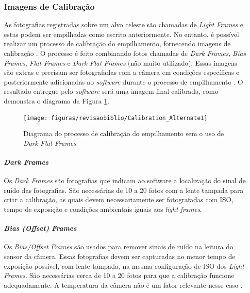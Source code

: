 \subsubsection{Imagens de Calibração}

As fotografias registradas sobre um alvo celeste são chamadas de \textit{Light Frames} e estas podem ser empilhadas como escrito anteriormente. No entanto, é possível realizar um processo de calibração do empilhamento, fornecendo imagens de calibração \cite{man:deepskystackerfaq}.
O processo é feito combinando fotos chamadas de \textit{Dark Frames},\textit{ Bias Frames}, \textit{Flat Frames} e \textit{Dark Flat Frames} (não muito utilizado). Essas imagens são extras e precisam ser fotografadas com a câmera em condições específicas e posteriormente adicionadas ao \textit{software} durante o processo de empilhamento 
\cite{man:deepskystackerBetterImages}. O resultado entregue pelo \textit{software} será uma imagem final calibrada, como demonstra o diagrama da Figura \ref{fig:calibrationDeepSkyStacker}.


\begin{figure}[!htb]
	\centering
	\caption{Diagrama do processo de calibração do empilhamento sem o uso de \textit{Dark Flat Frames}}
	\texttt{[image: figuras/revisaobiblio/Calibration\_Alternate1]}
	\label{fig:calibrationDeepSkyStacker}
\end{figure}


\paragraph{\textit{Dark Frames}}

Os \textit{Dark Frames} são fotografias que indicam ao software a localização do sinal de ruído das fotografias. São necessárias de 10 a 20 fotos com a lente tampada para criar a calibração, as quais devem necessariamente ser fotografadas com ISO, tempo de exposição e condições ambientais iguais aos \textit{light frames}.\cite{man:deepskystackerfaq}

\paragraph{\textit{Bias (Offset) Frames}}

Os \textit{Bias/Offset Frames} são usados para remover sinais de ruído na leitura do sensor da câmera. Essas fotografias devem ser capturadas no menor tempo de exposição possível, com lente tampada, na mesma configuração de ISO dos \textit{Light Frames}. São necessárias cerca de 10 a 20 fotos para que a calibração funcione adequadamente. A temperatura da câmera não é um fator relevante nesse caso \cite{man:deepskystackerfaq}.


